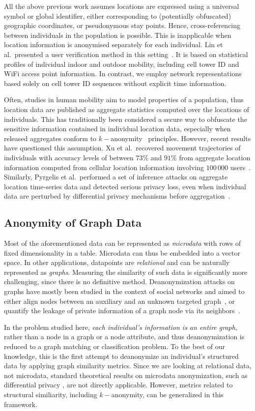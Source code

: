 All the above previous work assumes locations are expressed using a universal symbol or global identifier, either corresponding to (potentially obfuscated) geographic coordinates, or pseudonymous stay points.
Hence, cross-referencing between individuals in the population is possible.
This is inapplicable when location information is anonymised separately for each individual.
Lin et al.\ presented a user verification method in this setting~\cite{LinMobile}.
It is based on statistical profiles of individual indoor and outdoor mobility, including cell tower ID and WiFi access point information.
In contrast, we employ network representations based solely on cell tower ID sequences without explicit time information.

Often, studies in human mobility aim to model properties of a population, thus location data are published as aggregate statistics computed over the locations of individuals.
This has traditionally been considered a secure way to obfuscate the sensitive information contained in individual location data, especially when released aggregates conform to $ k-$anonymity~\cite{sweeney2002k} principles.
However, recent results have questioned this assumption.
Xu et al.\ recovered movement trajectories of individuals with accuracy levels of between $73\%$ and $91\%$ from aggregate location information computed from cellular location information involving $100\,000$ users~\cite{xu2017trajectory}. Similarly, Pyrgelis et al.\ performed a set of inference attacks on aggregate location time-series data and detected serious privacy loss, even when individual data are perturbed by differential privacy mechanisms before aggregation~\cite{pyrgelis2017does}.

\subsection{Anonymity of Graph Data }
Most of the aforementioned data can be represented as \emph{microdata} with rows of fixed dimensionality in a table.
Microdata can thus be embedded into a vector space.
In other applications, datapoints are \emph{relational} and can be naturally represented as \emph{graphs}.
Measuring the similarity of such data is significantly more challenging, since there is no definitive method.
Deanonymization attacks on graphs have mostly been studied in the context of social networks and aimed to either align nodes between an auxiliary and an unknown targeted graph~\cite{narayanan2009anonymizing, sharad2014}, or quantify the leakage of private information of a graph node via its neighbors~\cite{zheleva09}.

In the problem studied here, \emph{each individual's information is an entire graph}, rather than a node in a graph or a node attribute, and thus deanonymization is reduced to a graph matching or classification problem.
To the best of our knowledge, this is the first attempt to deanonymize an individual's structured data by applying graph similarity metrics.
Since we are looking at relational data, not microdata, standard theoretical results on microdata anonymization, such as differential privacy \cite{dwork2006calibrating}, are not directly applicable.
However, metrics related to structural similiarity, including $k-$anonymity, can be generalized in this framework.
